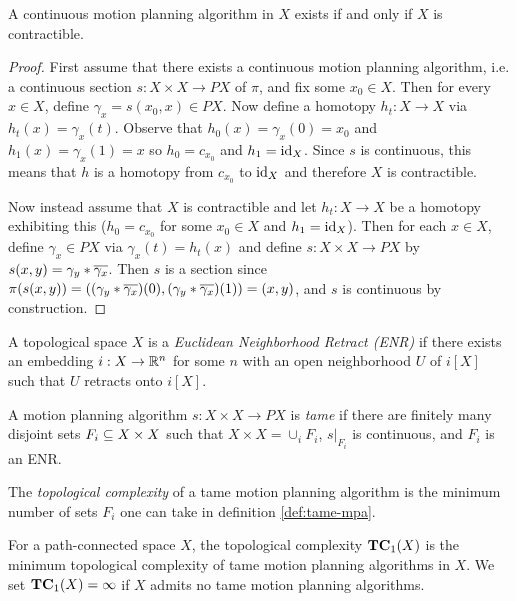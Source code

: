 \begin{lemma}\label{lem:cmpa-iff-contractible}
    A continuous motion planning algorithm in $X$ exists if and only if $X$ is contractible.
    \begin{proof}
        First assume that there exists a continuous motion planning algorithm, i.e. a continuous section $s : X \times X \to PX$ of $\pi$, and fix some $x_0 \in X$.
        Then for every $x \in X$, define $\gamma_x = s(x_0,x) \in PX$.
        Now define a homotopy $h_t : X \to X$ via $h_t(x) = \gamma_x(t)$.
        Observe that $h_0(x) = \gamma_x(0) = x_0$ and $h_1(x) = \gamma_x(1) = x$ so $h_0 = c_{x_0}$ and $h_1 = \id_X$.
        Since $s$ is continuous, this means that $h$ is a homotopy from $c_{x_0}$ to $\id_{X}$ and therefore $X$ is contractible.
        
        Now instead assume that $X$ is contractible and let $h_t : X \to X$ be a homotopy exhibiting this ($h_0 = c_{x_0}$ for some $x_0 \in X$ and $h_1 = \id_X$).
        Then for each $x \in X$, define $\gamma_x \in PX$ via $\gamma_x(t) = h_t(x)$ and define $s : X \times X \to PX$ by $s(x,y) = \gamma_y \ast \Bar{\gamma_x}$.
        Then $s$ is a section since $\pi(s(x,y)) = ((\gamma_y \ast \Bar{\gamma_x})(0), (\gamma_y \ast \Bar{\gamma_x})(1)) = (x,y)$, and $s$ is continuous by construction.
    \end{proof}
\end{lemma}

\begin{definition}\label{def:enr}
    A topological space $X$ is a \emph{Euclidean Neighborhood Retract (ENR)} if there exists an embedding $i : X \to \R^n$ for some $n$ with an open neighborhood $U$ of $i[X]$ such that $U$ retracts onto $i[X]$.
\end{definition}

\begin{definition}\label{def:tame-mpa}
    A motion planning algorithm $s : X \times X \to PX$ is \emph{tame} if there are finitely many disjoint sets $F_i \sub X \times X$ such that $X \times X = \cup_i F_i$, $s |_{F_i}$ is continuous, and $F_i$ is an ENR.
\end{definition}

\begin{definition}
    The \emph{topological complexity} of a tame motion planning algorithm is the minimum number of sets $F_i$ one can take in definition \ref{def:tame-mpa}.
\end{definition}

\begin{definition}\label{def:tc1}
    For a path-connected space $X$, the topological complexity $\TC_1(X)$ is the minimum topological complexity of tame motion planning algorithms in $X$.
    We set $\TC_1(X) = \infty$ if $X$ admits no tame motion planning algorithms.
\end{definition}

